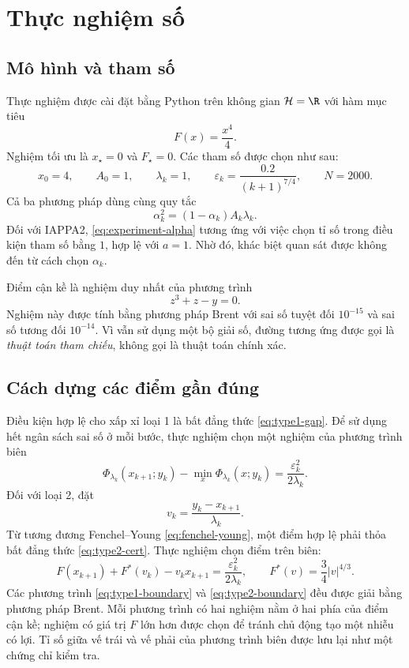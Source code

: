\section{Thực nghiệm số}

\subsection{Mô hình và tham số}

Thực nghiệm được cài đặt bằng Python trên không gian $\mathcal{H}=\R$ với hàm mục tiêu
\[
F(x)=\frac{x^4}{4}.
\]
Nghiệm tối ưu là $x_{\star}=0$ và $F_{\star}=0$. Các tham số được chọn như sau:
\begin{equation}
x_0=4,
\qquad
A_0=1,
\qquad
\lambda_k=1,
\qquad
\varepsilon_k=\frac{0.2}{(k+1)^{7/4}},
\qquad
N=2000.
\label{eq:experiment-params}
\end{equation}
Cả ba phương pháp dùng cùng quy tắc
\begin{equation}
\alpha_k^2=(1-\alpha_k)A_k\lambda_k.
\label{eq:experiment-alpha}
\end{equation}
Đối với IAPPA2, \eqref{eq:experiment-alpha} tương ứng với việc chọn tỉ số trong điều kiện tham số bằng $1$, hợp lệ với $a=1$. Nhờ đó, khác biệt quan sát được không đến từ cách chọn $\alpha_k$.

Điểm cận kề là nghiệm duy nhất của phương trình
\[
z^3+z-y=0.
\]
Nghiệm này được tính bằng phương pháp Brent với sai số tuyệt đối $10^{-15}$ và sai số tương đối $10^{-14}$. Vì vẫn sử dụng một bộ giải số, đường tương ứng được gọi là \emph{thuật toán tham chiếu}, không gọi là thuật toán chính xác.

\subsection{Cách dựng các điểm gần đúng}

Điều kiện hợp lệ cho xấp xỉ loại 1 là bất đẳng thức \eqref{eq:type1-gap}. Để sử dụng hết ngân sách sai số ở mỗi bước, thực nghiệm chọn một nghiệm của phương trình biên
\begin{equation}
\Phi_{\lambda_k}(x_{k+1};y_k)
-\min_x\Phi_{\lambda_k}(x;y_k)
=\frac{\varepsilon_k^2}{2\lambda_k}.
\label{eq:type1-boundary}
\end{equation}
Đối với loại 2, đặt
\[
v_k=\frac{y_k-x_{k+1}}{\lambda_k}.
\]
Từ tương đương Fenchel--Young \eqref{eq:fenchel-young}, một điểm hợp lệ phải thỏa bất đẳng thức \eqref{eq:type2-cert}. Thực nghiệm chọn điểm trên biên:
\begin{equation}
F(x_{k+1})+F^{*}(v_k)-v_kx_{k+1}
=\frac{\varepsilon_k^2}{2\lambda_k},
\qquad
F^{*}(v)=\frac{3}{4}|v|^{4/3}.
\label{eq:type2-boundary}
\end{equation}
Các phương trình \eqref{eq:type1-boundary} và \eqref{eq:type2-boundary} đều được giải bằng phương pháp Brent. Mỗi phương trình có hai nghiệm nằm ở hai phía của điểm cận kề; nghiệm có giá trị $F$ lớn hơn được chọn để tránh chủ động tạo một nhiễu có lợi. Tỉ số giữa vế trái và vế phải của phương trình biên được lưu lại như một chứng chỉ kiểm tra.

